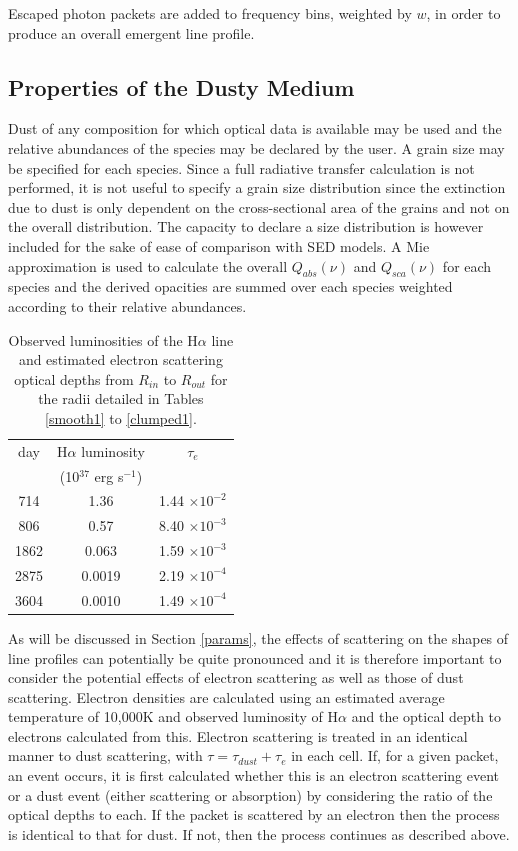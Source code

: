 \documentclass[useAMS,usenatbib,usegraphicx]{mnras}
\begin{document}
Escaped photon packets are added to frequency bins, weighted by $w$, in order to 
produce an overall emergent line profile.


\subsection{Properties of the Dusty Medium}

Dust of any composition for which optical data is available may be used
and the relative abundances of the species may be declared by the user.  
A grain size may be specified for each species.  Since a full radiative 
transfer calculation is not performed, it is not useful to specify a grain 
size distribution since the extinction due to dust is only dependent on the 
cross-sectional area of the grains and not on the overall distribution.  
The capacity to declare a size distribution is however included for the 
sake of ease of comparison with SED models.  A Mie approximation is used 
to calculate the overall $Q_{abs}(\nu)$ and $Q_{sca}(\nu)$ for each 
species and the derived opacities are summed over each species weighted 
according to their relative abundances.


\begin{table}
\caption{Observed luminosities of the H$\alpha$ line and estimated electron scattering optical depths from $R_{in}$ to $R_{out}$ for the radii detailed in Tables \ref{smooth1} to \ref{clumped1}.}
\begin{center}
\begin{tabular}{ccc}
\hline
day & H$\alpha$ luminosity & $\tau_e$ \\
& (10$^{37}$ erg s$^{-1}$) & \\
\hline
714 & 1.36 & 1.44 $\times 10^{-2}$ \\
806 & 0.57 & 8.40 $\times 10^{-3}$ \\
1862 & 0.063 & 1.59 $\times 10^{-3}$ \\
2875 & 0.0019 & 2.19 $\times 10^{-4}$ \\
3604 & 0.0010 & 1.49 $\times 10^{-4}$ \\
\hline
\end{tabular}
\end{center}
\label{tau_e}
\end{table}%

As will be discussed in Section \ref{params}, the effects of scattering 
on the shapes of line profiles can potentially be quite pronounced and it 
is therefore important to consider the potential effects of electron 
scattering as well as those of dust scattering.  Electron densities are 
calculated using an estimated average temperature of 10,000K and observed luminosity 
of H${\alpha}$ and the optical depth to electrons calculated from this.  
Electron scattering is treated in an identical manner to dust scattering, 
with $\tau = \tau_{dust}+\tau_{e}$ in each cell.  If, for a given 
packet, an event occurs, it is first calculated whether this is an electron scattering event or a dust 
event (either scattering or absorption) by considering the ratio of the optical depths 
to each.  If the packet is scattered by an electron then the 
process is identical to that for dust.  If not, then the process continues as 
described above.
\end{document}
